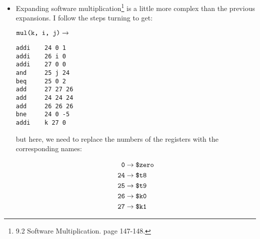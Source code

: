 \documentclass{article}
\begin{document}
\begin{enumerate}
{\begin{itemize}
{					\begin{minipage}{0.55\linewidth}
						\begin{displaymath}
							\begin{aligned}
								\verb|deref(j)| &\rightarrow \verb|lw j j 0| 
							\end{aligned}
						\end{displaymath}
					\end{minipage}
					\begin{minipage}{0.35\linewidth}
						
					\end{minipage}
				}
				\item {
					Expanding software multiplication\footnote{9.2 Software Multiplication. page 147-148.} is a little more complex than the previous expansions. I follow the steps turning to get:

					\begin{minipage}{0.55\linewidth}
						\hfil
						$\verb|mul(k, i, j)|\rightarrow$
						\begin{minipage}{3cm}
							\begin{Verbatim}[tabsize=2,frame=leftline]
addi	24 0 1
addi	26 i 0
addi	27 0 0
and 	25 j 24
beq 	25 0 2
add 	27 27 26
add 	24 24 24
add 	26 26 26
bne 	24 0 -5
addi	k 27 0
\end{Verbatim}
						\end{minipage}
					\end{minipage}
					\begin{minipage}{0.35\linewidth}
						
					\end{minipage}

					but here, we need to replace the numbers of the registers with the corresponding names:

					\begin{minipage}{0.55\linewidth}
						\begin{displaymath}
							\begin{aligned}
								\verb|0| &\rightarrow \verb|$zero| \\
								\verb|24| &\rightarrow \verb|$t8| \\
								\verb|25| &\rightarrow \verb|$t9| \\
								\verb|26| &\rightarrow \verb|$k0| \\
								\verb|27| &\rightarrow \verb|$k1|
							\end{aligned}
						\end{displaymath}
					\end{minipage}
					\begin{minipage}{0.35\linewidth}
						
					\end{minipage}
				}
			\end{itemize}

}
\end{enumerate}
\end{document}
